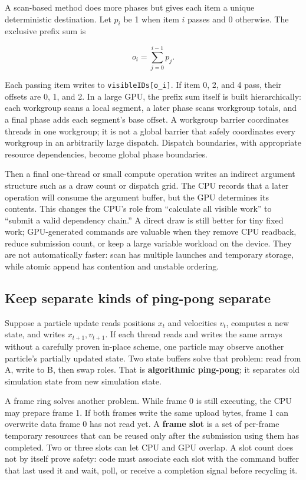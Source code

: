 A scan-based method does more phases but gives each item a unique deterministic destination. Let \(p_i\) be 1 when item \(i\) passes and 0 otherwise. The exclusive prefix sum is

\[
o_i=\sum_{j=0}^{i-1}p_j.
\]

Each passing item writes to \texttt{visibleIDs{[}o\_i{]}}. If item 0, 2, and 4 pass, their offsets are 0, 1, and 2. In a large GPU, the prefix sum itself is built hierarchically: each workgroup scans a local segment, a later phase scans workgroup totals, and a final phase adds each segment's base offset. A workgroup barrier coordinates threads in one workgroup; it is not a global barrier that safely coordinates every workgroup in an arbitrarily large dispatch. Dispatch boundaries, with appropriate resource dependencies, become global phase boundaries.

Then a final one-thread or small compute operation writes an indirect argument structure such as a draw count or dispatch grid. The CPU records that a later operation will consume the argument buffer, but the GPU determines its contents. This changes the CPU's role from ``calculate all visible work'' to ``submit a valid dependency chain.'' A direct draw is still better for tiny fixed work; GPU-generated commands are valuable when they remove CPU readback, reduce submission count, or keep a large variable workload on the device. They are not automatically faster: scan has multiple launches and temporary storage, while atomic append has contention and unstable ordering.

\subsection{Keep separate kinds of ping-pong separate}\label{05-engine-i-ch019-keep-separate-kinds-of-ping-pong-separate}

Suppose a particle update reads positions \(x_t\) and velocities \(v_t\), computes a new state, and writes \(x_{t+1},v_{t+1}\). If each thread reads and writes the same arrays without a carefully proven in-place scheme, one particle may observe another particle's partially updated state. Two state buffers solve that problem: read from A, write to B, then swap roles. That is \textbf{algorithmic ping-pong}; it separates old simulation state from new simulation state.

A frame ring solves another problem. While frame 0 is still executing, the CPU may prepare frame 1. If both frames write the same upload bytes, frame 1 can overwrite data frame 0 has not read yet. A \textbf{frame slot} is a set of per-frame temporary resources that can be reused only after the submission using them has completed. Two or three slots can let CPU and GPU overlap. A slot count does not by itself prove safety: code must associate each slot with the command buffer that last used it and wait, poll, or receive a completion signal before recycling it.


